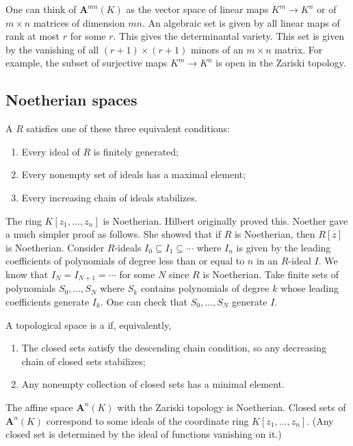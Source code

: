\documentclass [11 pt, oneside] {article}
\begin{document}
\begin{example}\label{}
One can think of $\mathbf{A}^{mn}(K)$ as the vector space of linear maps $K^m \longrightarrow K^n$ or of $m\times n$ matrices of dimension $mn$. An algebraic set is given by all linear maps of rank at most $r$ for some $r$. This gives the determinantal variety. This set is given by the vanishing of all $(r+1)\times  (r+1)$ minors of an $m\times n $ matrix. For example, the subset of surjective maps $K^m\longrightarrow K^n$ is open in the Zariski topology.
\end{example}

\subsection{Noetherian spaces}
\begin{definition}[ ]\label{}
A  $R$ satisfies one of these three equivalent conditions:
\begin{enumerate}
	\item Every ideal of $R$ is finitely generated;
	\item Every nonempty set of ideals has a maximal element;
	\item Every increasing chain of ideals stabilizes. 
\end{enumerate}
\end{definition}

\begin{example}[ ]\label{}
The ring $K[z_1,\hdots,z_n]$ is Noetherian. Hilbert originally proved this. Noether gave a much simpler proof as follows. She showed that if $R$ is Noetherian, then $R[z]$ is Noetherian. Consider $R$-ideals $I_0\subseteq I_1\subseteq\cdots$ where $I_n$ is given by the leading coefficients of polynomials of degree less than or equal to $n$ in an $R$-ideal $I$. We know that $I_N=I_{N+1}=\cdots$ for some $N$ since $R$ is Noetherian. Take finite sets of polynomials $S_0,\hdots, S_N$ where $S_k$ contains polynomials of degree $k$ whose leading coefficients generate $I_k$. One can check that $S_0,\hdots, S_N$ generate $I$. 
\end{example}

\begin{definition}[ ]\label{}
A topological space is a  if, equivalently,
\begin{enumerate}
	\item The closed sets satisfy the descending chain condition, so any decreasing chain of closed sets stabilizes;
	\item Any nonempty collection of closed sets has a minimal element.
\end{enumerate}
\end{definition}
 \begin{remark}
 	The affine space $\mathbf{A}^n(K)$ with the Zariski topology is Noetherian. Closed sets of $\mathbf{A}^n(K)$ correspond to some ideals of the coordinate ring $K[z_1,\hdots, z_n]$. (Any closed set is determined by the ideal of functions vanishing on it.)
 \end{remark}
\end{document}
